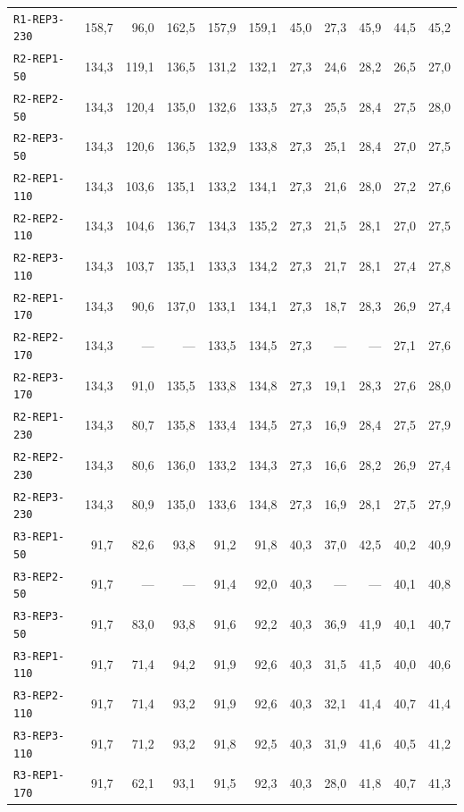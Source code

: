 \begin{footnotesize}
\begin{longtable}{@{}lrrrrrrrrrr@{}}
\texttt{R1-REP3-230} & 158,7 & 96,0 & 162,5 & 157,9 & 159,1 & 45,0 & 27,3 & 45,9 & 44,5 & 45,2 \\
\texttt{R2-REP1-50} & 134,3 & 119,1 & 136,5 & 131,2 & 132,1 & 27,3 & 24,6 & 28,2 & 26,5 & 27,0 \\
\texttt{R2-REP2-50} & 134,3 & 120,4 & 135,0 & 132,6 & 133,5 & 27,3 & 25,5 & 28,4 & 27,5 & 28,0 \\
\texttt{R2-REP3-50} & 134,3 & 120,6 & 136,5 & 132,9 & 133,8 & 27,3 & 25,1 & 28,4 & 27,0 & 27,5 \\
\texttt{R2-REP1-110} & 134,3 & 103,6 & 135,1 & 133,2 & 134,1 & 27,3 & 21,6 & 28,0 & 27,2 & 27,6 \\
\texttt{R2-REP2-110} & 134,3 & 104,6 & 136,7 & 134,3 & 135,2 & 27,3 & 21,5 & 28,1 & 27,0 & 27,5 \\
\texttt{R2-REP3-110} & 134,3 & 103,7 & 135,1 & 133,3 & 134,2 & 27,3 & 21,7 & 28,1 & 27,4 & 27,8 \\
\texttt{R2-REP1-170} & 134,3 & 90,6 & 137,0 & 133,1 & 134,1 & 27,3 & 18,7 & 28,3 & 26,9 & 27,4 \\
\texttt{R2-REP2-170} & 134,3 & --- & --- & 133,5 & 134,5 & 27,3 & --- & --- & 27,1 & 27,6 \\
\texttt{R2-REP3-170} & 134,3 & 91,0 & 135,5 & 133,8 & 134,8 & 27,3 & 19,1 & 28,3 & 27,6 & 28,0 \\
\texttt{R2-REP1-230} & 134,3 & 80,7 & 135,8 & 133,4 & 134,5 & 27,3 & 16,9 & 28,4 & 27,5 & 27,9 \\
\texttt{R2-REP2-230} & 134,3 & 80,6 & 136,0 & 133,2 & 134,3 & 27,3 & 16,6 & 28,2 & 26,9 & 27,4 \\
\texttt{R2-REP3-230} & 134,3 & 80,9 & 135,0 & 133,6 & 134,8 & 27,3 & 16,9 & 28,1 & 27,5 & 27,9 \\
\texttt{R3-REP1-50} & 91,7 & 82,6 & 93,8 & 91,2 & 91,8 & 40,3 & 37,0 & 42,5 & 40,2 & 40,9 \\
\texttt{R3-REP2-50} & 91,7 & --- & --- & 91,4 & 92,0 & 40,3 & --- & --- & 40,1 & 40,8 \\
\texttt{R3-REP3-50} & 91,7 & 83,0 & 93,8 & 91,6 & 92,2 & 40,3 & 36,9 & 41,9 & 40,1 & 40,7 \\
\texttt{R3-REP1-110} & 91,7 & 71,4 & 94,2 & 91,9 & 92,6 & 40,3 & 31,5 & 41,5 & 40,0 & 40,6 \\
\texttt{R3-REP2-110} & 91,7 & 71,4 & 93,2 & 91,9 & 92,6 & 40,3 & 32,1 & 41,4 & 40,7 & 41,4 \\
\texttt{R3-REP3-110} & 91,7 & 71,2 & 93,2 & 91,8 & 92,5 & 40,3 & 31,9 & 41,6 & 40,5 & 41,2 \\
\texttt{R3-REP1-170} & 91,7 & 62,1 & 93,1 & 91,5 & 92,3 & 40,3 & 28,0 & 41,8 & 40,7 & 41,3 \\

\end{longtable}
\end{footnotesize}
